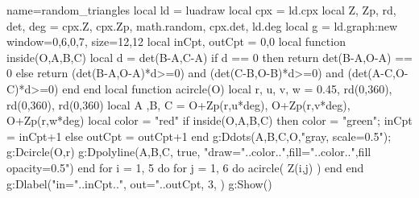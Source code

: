 \documentclass{standalone}%
\begin{document}
\begin{luadraw}{name=random_triangles}
local ld = luadraw
local cpx = ld.cpx
local Z, Zp, rd, det, deg = cpx.Z, cpx.Zp, math.random, cpx.det, ld.deg
local g = ld.graph:new{ window={0,6,0,7}, size={12,12} }
local inCpt, outCpt = 0,0
local function inside(O,A,B,C)
    local d = det(B-A,C-A)
    if d == 0 then return det(B-A,O-A) == 0 
    else return (det(B-A,O-A)*d>=0) and (det(C-B,O-B)*d>=0) and (det(A-C,O-C)*d>=0)
    end
end
local function acircle(O)
    local r, u, v, w = 0.45, rd(0,360), rd(0,360), rd(0,360)
    local A ,B, C = O+Zp(r,u*deg), O+Zp(r,v*deg), O+Zp(r,w*deg) 
    local color = "red"
    if inside(O,A,B,C) then color = "green"; inCpt = inCpt+1
    else outCpt = outCpt+1 end
    g:Ddots({A,B,C,O},"gray, scale=0.5"); g:Dcircle(O,r)
    g:Dpolyline({A,B,C}, true, 
        "draw="..color..",fill="..color..",fill opacity=0.5")
end
for i = 1, 5 do for j = 1, 6 do acircle( Z(i,j) ) end end
g:Dlabel("in="..inCpt..", out="..outCpt, 3, {})
g:Show()
\end{luadraw}
\end{document}
